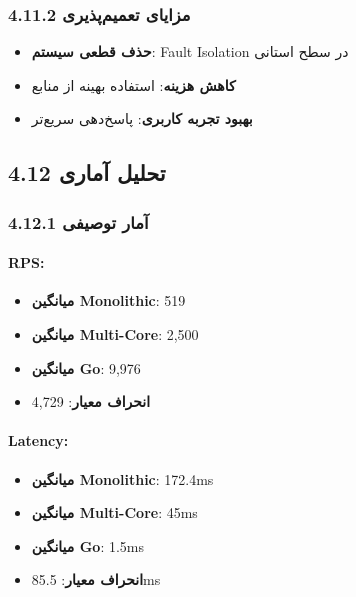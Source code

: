 \documentclass[
]{article}
\providecommand{\tightlist}{%
  \setlength{\itemsep}{0pt}\setlength{\parskip}{0pt}}
\begin{document}
\subsubsection{4.11.2 مزایای
تعمیم‌پذیری}\label{ux645ux632ux627ux6ccux627ux6cc-ux62aux639ux645ux6ccux645ux67eux630ux6ccux631ux6cc}

\begin{itemize}
\tightlist
\item
  \textbf{حذف قطعی سیستم}: Fault Isolation در سطح استانی
\item
  \textbf{کاهش هزینه}: استفاده بهینه از منابع
\item
  \textbf{بهبود تجربه کاربری}: پاسخ‌دهی سریع‌تر
\end{itemize}

\subsection{4.12 تحلیل
آماری}\label{ux62aux62dux644ux6ccux644-ux622ux645ux627ux631ux6cc}

\subsubsection{4.12.1 آمار
توصیفی}\label{ux622ux645ux627ux631-ux62aux648ux635ux6ccux641ux6cc-1}

\paragraph{RPS:}\label{rps}

\begin{itemize}
\tightlist
\item
  \textbf{میانگین Monolithic}: 519
\item
  \textbf{میانگین Multi-Core}: 2,500
\item
  \textbf{میانگین Go}: 9,976
\item
  \textbf{انحراف معیار}: 4,729
\end{itemize}

\paragraph{Latency:}\label{latency}

\begin{itemize}
\tightlist
\item
  \textbf{میانگین Monolithic}: 172.4ms
\item
  \textbf{میانگین Multi-Core}: 45ms
\item
  \textbf{میانگین Go}: 1.5ms
\item
  \textbf{انحراف معیار}: 85.5ms
\end{itemize}
\end{document}
